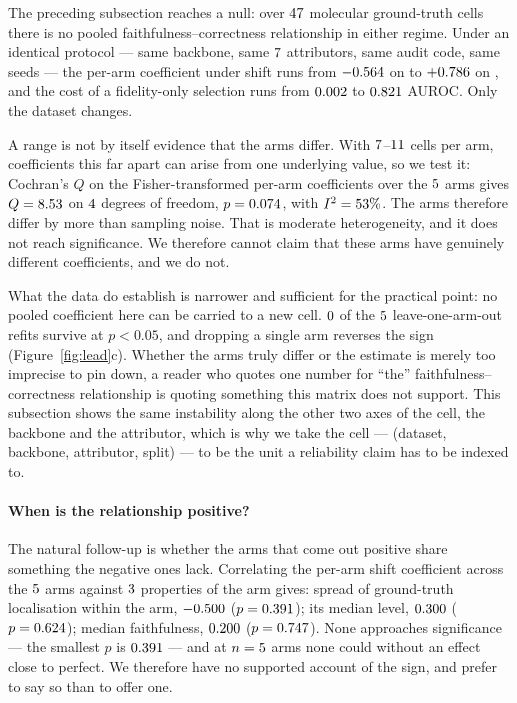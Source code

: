 The preceding subsection reaches a null: over $47{}$ molecular
ground-truth cells there is no pooled faithfulness--correctness relationship in
either regime. Under an identical protocol --- same backbone, same
$7{}$ attributors, same audit code, same seeds --- the per-arm
coefficient under shift runs from $-0.564{}$ on
\armShiftRhoMinDataset{} to $+0.786{}$ on \armShiftRhoMaxDataset{},
and the cost of a fidelity-only selection runs from $0.002{}$ to
$0.821{}$ AUROC. Only the dataset changes.

\ifHasArmHomogeneity
A range is not by itself evidence that the arms differ. With
$7{}$--$11{}$ cells per arm, coefficients this far
apart can arise from one underlying value, so we test it: Cochran's $Q$ on the
Fisher-transformed per-arm coefficients over the $5{}$ arms gives
$Q=8.53{}$ on $4{}$ degrees of freedom,
$p=0.074{}$, with $I^{2}=53{}\%$.
\ifHasArmHomogSig
The arms therefore differ by more than sampling noise.
\else
That is moderate heterogeneity, and it does not reach significance. We
therefore cannot claim that these arms have genuinely different coefficients,
and we do not.
\fi
\fi

What the data do establish is narrower and sufficient for the practical point:
no pooled coefficient here can be carried to a new cell. $0{}$ of
the $5{}$ leave-one-arm-out refits survive at $p<0.05$, and dropping a
single arm reverses the sign (Figure~\ref{fig:lead}c). Whether the arms truly
differ or the estimate is merely too imprecise to pin down, a reader who
quotes one number for ``the'' faithfulness--correctness relationship is
quoting something this matrix does not support. This subsection shows the same
instability along the other two axes of the cell, the backbone and the
attributor, which is why we take the cell --- (dataset, backbone, attributor,
split) --- to be the unit a reliability claim has to be indexed to.

\ifHasHeterogeneityScreen
\paragraph{When is the relationship positive?} The natural follow-up is
whether the arms that come out positive share something the negative ones lack.
Correlating the per-arm shift coefficient across the $5{}$ arms
against $3{}$ properties of the arm gives: spread of ground-truth
localisation within the arm, $-0.500{}$ ($p=0.391{}$); its median
level, $0.300{}$ ($p=0.624{}$); median faithfulness,
$0.200{}$ ($p=0.747{}$). None approaches significance
--- the smallest $p$ is $0.391{}$ --- and at $n=5{}$ arms none
could without an effect close to perfect. We therefore have no supported
account of the sign, and prefer to say so than to offer one.

